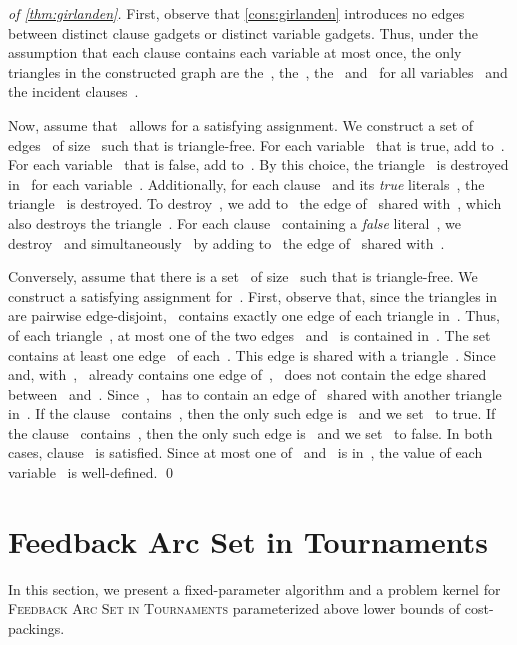 \documentclass[envcountsame,numbook,smallextended]{svjour3}
\numberwithin{equation}{section}
\numberwithin{figure}{section}
\begin{document}
\begin{proof}[of \cref{thm:girlanden}]
  First, observe that \cref{cons:girlanden} introduces no edges between distinct clause gadgets or distinct variable gadgets.  Thus, under the assumption that each clause contains each variable at most once, the only triangles in the constructed graph are the~, the~, the~ and~ for all variables~ and the incident clauses~.


  Now, assume that ~allows for a satisfying assignment.  We construct a set of edges~ of size~ such that  is triangle-free.  For each variable~ that is true, add  to~.  For each variable~ that is false, add  to~.  By this choice, the triangle~ is destroyed in~ for each variable~.  Additionally,
  for each clause~ and its \emph{true} literals~, the triangle~ is destroyed. To destroy~, we add to~ the edge of~ shared with~, which also destroys the triangle~.
  For each clause~ containing a \emph{false} literal~, we destroy~ and simultaneously~ by adding to~ the edge of~ shared with~.

  Conversely, assume that there is a set~ of size~ such that  is triangle-free.  We construct a satisfying assignment for~.
  First, observe that, since the triangles in  are pairwise edge-disjoint, ~contains exactly one edge of each triangle in~.  Thus, of each triangle~, at most one of the two edges~ and~ is contained in~.
  The set~ contains at least one edge~ of each~.  This edge is shared with a triangle~.  Since  and, with~, ~already contains one edge of~, ~does not contain the edge shared between~ and~.  Since~, ~has to contain an edge of~ shared with another triangle in~.  If the clause~ contains~, then the only such edge is~ and we set~ to true.  If the clause~ contains~, then the only such edge is~ and we set~ to false.  In both cases, clause~ is satisfied.  Since at most one of~ and~ is in~, the value of each variable~ is well-defined.
\qed\end{proof}

\section{Feedback Arc Set in Tournaments}
\label{sec:fast}
 
In this section, we present a fixed-parameter algorithm and a problem kernel for \textsc{Feedback Arc Set in Tournaments} parameterized above lower bounds of cost- packings. 
\end{document}
